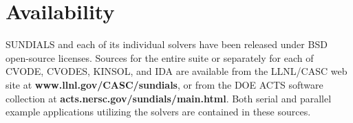 \section{Availability}
\label{s:availability}

SUNDIALS and each of its individual solvers have been released 
under BSD open-source licenses.
Sources for the entire suite or separately for each of CVODE, 
CVODES, KINSOL, and IDA are available from the LLNL/CASC web site at
\newline \hspace*{.5in} {\bf www.llnl.gov/CASC/sundials},
\newline or from the DOE ACTS software collection at
\newline \hspace*{.5in} {\bf acts.nersc.gov/sundials/main.html}.
\newline
Both serial and parallel example applications utilizing the solvers 
are contained in these sources. 





